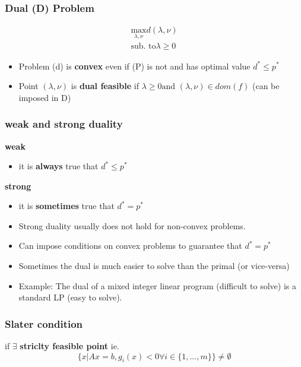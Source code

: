 \subsubsection{Dual (D) Problem}
\begin{gather*}
    \underset{\lambda, \nu}{\mathrm{max}} d(\lambda,\nu)\\
    \textrm{sub. to} \lambda \geq 0
\end{gather*}
\begin{itemize}
    \item Problem (d) is \textbf{convex} even if (P) is not and has optimal value $d^* \leq p^*$
    \item Point $(\lambda ,\nu)$ is \textbf{dual feasible} if $\lambda \geq 0 \textrm{and }(\lambda,\nu) \in dom(f) $ (can be imposed in D)
\end{itemize}
\subsubsection{weak and strong duality}
\textbf{weak}
\begin{itemize}
    \item it is \textbf{always} true that $d^*\leq p^*$
\end{itemize}
\textbf{strong}
\begin{itemize}
    \item it is \textbf{sometimes} true that $d^* = p^*$
    \item Strong duality usually does not hold for non-convex problems.
    \item Can impose conditions on convex problems to guarantee that $d^*= p^*$
    \item Sometimes the dual is much easier to solve than the primal (or vice-versa)
    \item Example: The dual of a mixed integer linear program (difficult to solve) is
a standard LP (easy to solve).
\end{itemize}
\subsubsection{Slater condition}
if $\exists$ \textbf{striclty feasible point} ie.\[ \{ x|Ax= b, g_i(x) < 0 \forall i \in \{1,\dots,m\}\}\neq \emptyset\]
